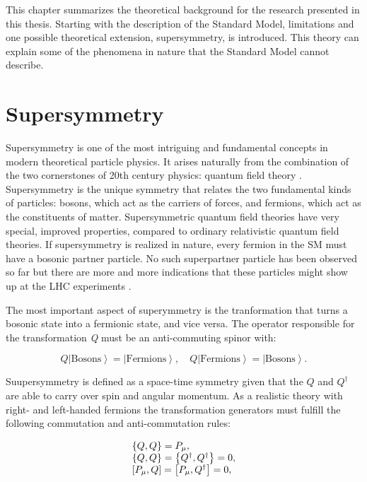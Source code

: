 \clearpage



This chapter summarizes the theoretical background for the research presented in this thesis. Starting with the description of the Standard Model,  limitations and one possible theoretical extension, supersymmetry, is introduced. This theory can explain some of the phenomena in nature that the Standard Model cannot describe.

\section{Supersymmetry}

Supersymmetry is one of the most intriguing and fundamental concepts in modern theoretical particle physics. It arises naturally from the combination of the two cornerstones of 20th century physics: quantum field theory \cite{Miller:2013jra}. Supersymmetry is the unique symmetry that relates the two fundamental kinds of particles: bosons, which act as the carriers of forces, and fermions, which act as the constituents of matter. Supersymmetric quantum field theories have very special, improved properties, compared to ordinary relativistic quantum field theories. If supersymmetry is realized in nature, every fermion in the SM must have a bosonic partner particle. No such superpartner particle has been observed so far but there are more and more indications that these particles might show up at the LHC experiments \cite{Athron:2011wu}.

The most important aspect of superymmetry is the tranformation that turns a bosonic state into a fermionic state, and vice versa. The operator responsible for the transformation \textit{Q} must be an anti-commuting spinor with:

\begin{equation}
Q\left|\text{Bosons}\right> = \left|\text{Fermions}\right>, \quad Q\left|\text{Fermions}\right> = \left|\text{Bosons}\right>. 
\end{equation}

Suupersymmetry is defined as a space-time symmetry given that the $Q$ and $Q^{\dagger}$ are able to carry over spin and angular momentum. As a realistic theory with right- and left-handed fermions the transformation generators must fulfill the following commutation and anti-commutation rules:

\begin{equation}
\begin{array}{l c l}
\left\{Q, Q\right\} = P_{\mu}, \\
\left\{Q, Q\right\} = \left\{Q^{\dagger}, Q^{\dagger}\right\} = 0, \\
\left[P_{\mu}, Q\right] = \left[P_{\mu}, Q^{\dagger}\right] = 0,
\end{array}
\end{equation}

